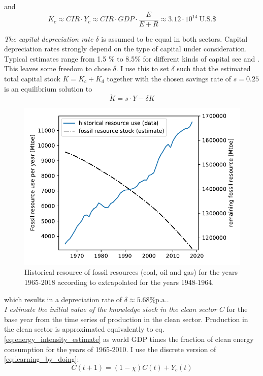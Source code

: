 and 
\begin{equation}
  K_c \approx CIR \cdot Y_c \approx CIR \cdot GDP \cdot \frac{E}{E + R} \approx 3.12 \cdot 10^{14} ~ \textrm{U.S.} \$
  \label{eq:approx_clean_capital}
\end{equation}

\textit{The capital depreciation rate $\delta$} is assumed to be equal in both sectors. Capital depreciation rates strongly depend on the type of capital under consideration. Typical estimates range from 1.5 \% to 8.5\% for different kinds of capital see \cite{Kamps2005} and \cite{Gupta2014}. This leaves some freedom to chose $\delta$. I use this to set $\delta$ such that the estimated total capital stock $K = K_c + K_d$ together with the chosen savings rate of $s=0.25$ is an equilibrium solution to 
\begin{equation}
  \dot{K} = s \cdot Y - \delta K
  \label{eq:delta_estimate}
\end{equation} 
\begin{figure}
	\vspace{-.4 cm}
        \includegraphics[width = .65 \textwidth]{./figures/fossil_resource_per_year.pdf}
        \caption{Historical resource of fossil resources (coal, oil and gas) for the years 1965-2018 according to \cite{dudley2019bp} extrapolated for the years 1948-1964. \label{fig:historical_resource_use}}
\end{figure}
which results in a depreciation rate of $\delta\approx 5.68 \% \mathrm{p.a.}$.\\

\textit{I estimate the initial value of the knowledge stock in the clean sector $C$} for the base year from the time series of production in the clean sector. Production in the clean sector is approximated equivalently to eq. \ref{eq:energy_intensity_estimate} as world GDP times the fraction of clean energy consumption for the years of 1965-2010. I use the discrete version of \eqref{eq:learning_by_doing}:
\begin{equation} 
  C(t+1) = (1-\chi)C(t) + Y_c(t)
  \label{eq:discrete_clean_knowledge}
\end{equation}

